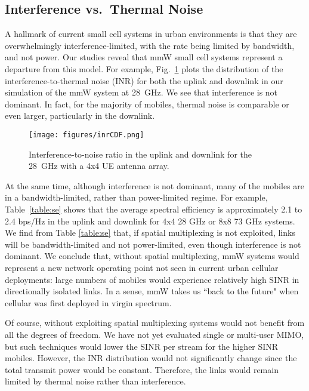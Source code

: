 \documentclass[journal]{IEEEtran}
\begin{document}
\subsection{Interference vs.\ Thermal Noise}

A hallmark of current small cell systems in urban environments is that they
are overwhelmingly interference-limited, with the rate being limited
by bandwidth, and not power.  Our studies reveal that mmW small cell systems
represent a departure from this model.  For example, Fig.~\ref{fig:inrCDF}
plots the distribution of the interference-to-thermal noise (INR) for
both the uplink and downlink in our simulation of the mmW system
at 28~GHz.  We see that interference is not dominant.  In fact, for the majority
of mobiles, thermal noise is comparable or even larger,
particularly in the downlink.


\begin{figure}
    \centering
    \texttt{[image: figures/inrCDF.png]}
    \caption{Interference-to-noise ratio in the uplink and downlink
    for the 28~GHz with a 4x4 UE antenna array.}
    \label{fig:inrCDF}
\end{figure}

At the same time, although interference is not dominant, many of the mobiles
are in a bandwidth-limited, rather than power-limited regime.  For example,
Table~\ref{table:se} shows that the average spectral efficiency is
approximately 2.1 to 2.4 bps/Hz in the uplink and downlink for 4x4 28 GHz
or 8x8 73 GHz systems.
We find from Table \ref{table:se} that, if spatial multiplexing is not exploited,
links will be bandwidth-limited and not power-limited, even though interference
is not dominant.
We conclude that, without spatial multiplexing,
mmW systems would represent a new network operating point
not seen in current urban cellular deployments:  large numbers of mobiles would
experience relatively high SINR in directionally isolated links.
In a sense, mmW takes us ``back to the future" when cellular
was first deployed in virgin spectrum.

Of course, without exploiting spatial multiplexing systems would not
benefit from all the degrees of freedom.
We have not yet evaluated single or multi-user MIMO, but such techniques
would lower the SINR per stream for the higher SINR mobiles.  However, the
INR distribution would not significantly change since the total transmit power
would be constant.  Therefore, the links would remain limited by thermal noise
rather than interference.
\end{document}
